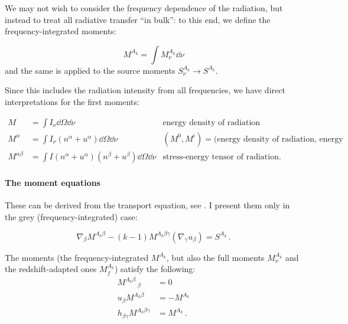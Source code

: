 \documentclass[main.tex]{subfiles}
\begin{document}
We may not wish to consider the frequency dependence of the radiation, but instead to treat all radiative transfer ``in bulk'': to this end, we define the frequency-integrated moments:

\begin{equation}
   M ^{A_k} = \int M^{A_k} _\nu \dd{\nu}
\end{equation}
and the same is applied to the source moments \(S_\nu^{A_k} \rightarrow S^{A_k}\).

Since this includes the radiation intensity from all frequencies, we have direct interpretations for the first moments:

\begin{subequations}
\begin{align}
   M &= \int  I_\nu \dd{\Omega} \dd{\nu}   & \text{energy density of radiation}  \\
   M^\alpha &= \int I_\nu (n^\alpha + u^\alpha)\dd{\Omega} \dd{\nu}   & (M^0, M^i) = \text{(energy density of radiation, energy flux)}  \\
   M^{\alpha\beta} &= \int I (n^\alpha + u^\alpha)(n^\beta + u^\beta)\dd{\Omega} \dd{\nu}   & \text{stress-energy tensor of radiation.}
\end{align}
\end{subequations}

\paragraph{The moment equations}

These can be derived from the transport equation, see \cite[eq. 3.14]{Thorne:1981feb}. I present them only in the grey (frequency-integrated) case:

\begin{equation} \label{eq:grey-moment-equations}
  \nabla_\beta M^{A_k \beta} - (k-1) M^{A_k \beta \gamma} (\nabla_ \gamma u_\beta)= S^{A_k} \,.
\end{equation}

The moments (the frequency-integrated \(M^{A_k}\), but also the full moments \(M^{A_k}_\nu\) and the redshift-adapted ones \(M^{A_k}_f\)) satisfy the following:
\begin{subequations}
\begin{align}
  M^{A_k \beta}\,_\beta &= 0 \\
  u_\beta M^{A_k \beta} &= -M^{A_k} \\
  h_{\beta \gamma} M^{A_k \beta \gamma} &= M^{A_k} \,.
\end{align}
\end{subequations}
\end{document}
